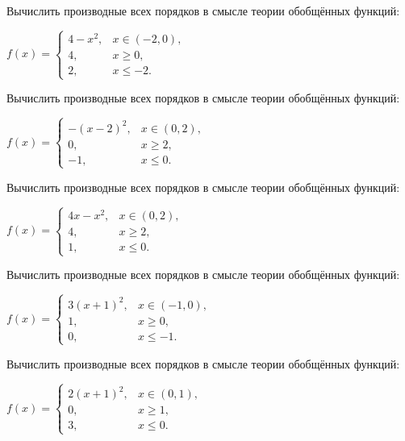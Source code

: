 \begin{cond}
	Вычислить производные всех порядков в смысле теории обобщённых функций:

	\(
	f(x) =
	\begin{cases}
		4 - x^2, & x \in (-2,0), \\
		4,       & x \ge 0,      \\
		2,       & x \le -2.
	\end{cases}
	\)
\end{cond}

\begin{cond}
	Вычислить производные всех порядков в смысле теории обобщённых функций:

	\(
	f(x) =
	\begin{cases}
		-(x - 2)^2, & x \in (0,2), \\
		0,          & x \ge 2,     \\
		-1,         & x \le 0.
	\end{cases}
	\)
\end{cond}

\begin{cond}
	Вычислить производные всех порядков в смысле теории обобщённых функций:

	\(
	f(x) =
	\begin{cases}
		4x - x^2, & x \in (0,2), \\
		4,        & x \ge 2,     \\
		1,        & x \le 0.
	\end{cases}
	\)
\end{cond}

\begin{cond}
	Вычислить производные всех порядков в смысле теории обобщённых функций:

	\(
	f(x) =
	\begin{cases}
		3(x+1)^2, & x \in (-1,0), \\
		1,        & x \ge 0,      \\
		0,        & x \le -1.
	\end{cases}
	\)
\end{cond}

\begin{cond}
	Вычислить производные всех порядков в смысле теории обобщённых функций:

	\(
	f(x) =
	\begin{cases}
		2(x+1)^2, & x \in (0,1), \\
		0,        & x \ge 1,     \\
		3,        & x \le 0.
	\end{cases}
	\)
\end{cond}

